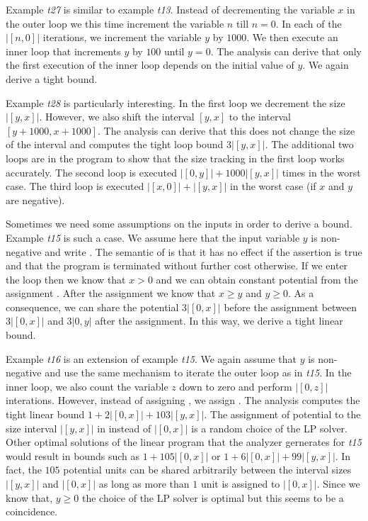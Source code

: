 \documentclass[nocopyrightspace,preprint]{sigplanconf}
\begin{document}
Example \emph{t27} is similar to example \emph{t13}.  Instead of
decrementing the variable $x$ in the outer loop we this time increment
the variable $n$ till $n = 0$.  In each of the $|[n,0]|$ iterations,
we increment the variable $y$ by $1000$.  We then execute an inner
loop that increments $y$ by $100$ until $y=0$.  The analysis can
derive that only the first execution of the inner loop depends on the
initial value of $y$.  We again derive a tight bound.

Example \emph{t28} is particularly interesting.  In the first loop we
decrement the size $|[y,x]|$.  However, we also shift the interval
$[y,x]$ to the interval $[y+1000,x+1000]$.  The analysis can derive
that this does not change the size of the interval and computes the
tight loop bound $3|[y,x]|$.  The additional two loops are in the
program to show that the size tracking in the first loop works
accurately.  The second loop is executed $|[0,y]| + 1000|[y,x]|$ times
in the worst case.  The third loop is executed $|[x,0]| + |[y,x]|$ in
the worst case (if $x$ and $y$ are negative).

Sometimes we need some assumptions on the inputs in order to derive a
bound.  Example \emph{t15} is such a case.  We assume here that the
input variable $y$ is non-negative and write .  The
semantic of  is that it has no effect if the assertion is
true and that the program is terminated without further cost
otherwise.  If we enter the loop then we know that $x>0$ and we can
obtain constant potential from the assignment .  After the
assignment we know that $x\geq y$ and $y\geq 0$.  As a consequence, we
can share the potential $3|[0,x]|$ before the assignment 
between $3|[0,x]|$ and $3|0,y|$ after the assignment.  In this way, we
derive a tight linear bound.

Example \emph{t16} is an extension of example \emph{t15}. We again
assume that $y$ is non-negative and use the same mechanism to iterate
the outer loop as in \emph{t15}.  In the inner loop, we also count the
variable $z$ down to zero and perform $|[0,z]|$ interations.  However,
instead of assigning , we assign .  The analysis
computes the tight linear bound $1+2|[0,x]|+103|[y,x]|$.  The
assignment of potential to the size interval $|[y,x]|$ in instead of
$|[0,x]|$ is a random choice of the LP solver.  Other optimal
solutions of the linear program that the analyzer gernerates for
\emph{t15} would result in bounds such as $1+105|[0,x]|$ or
$1+6|[0,x]|+99|[y,x]|$.  In fact, the $105$ potential units can be
shared arbitrarily between the interval sizes $|[y,x]|$ and $|[0,x]|$
as long as more than $1$ unit is assigned to $|[0,x]|$.  Since we know
that, $y\geq 0$ the choice of the LP solver is optimal but this seems
to be a coincidence.
\end{document}
